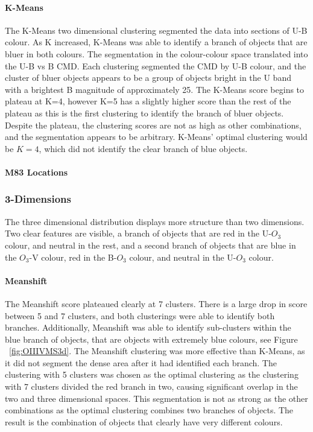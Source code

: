 \paragraph{K-Means}
The K-Means two dimensional clustering segmented the data into sections of U-B colour.
As K increased, K-Means was able to identify a branch of objects that are bluer in both colours.
The segmentation in the colour-colour space translated into the U-B vs B CMD. 
Each clustering segmented the CMD by U-B colour, and the cluster of bluer objects appears to be a group of objects bright in the U band with a brightest B magnitude of approximately 25.
The K-Means score begins to plateau at K=4, however K=5 has a slightly higher score than the rest of the plateau as this is the first clustering to identify the branch of bluer objects.
Despite the plateau, the clustering scores are not as high as other combinations, and the segmentation appears to be arbitrary.
K-Means' optimal clustering would be $K=4$, which did not identify the clear branch of blue objects.

\paragraph{M83 Locations}

\subsubsection{3-Dimensions}
The three dimensional distribution displays more structure than two dimensions.
Two clear features are visible, a branch of objects that are red in the U-$O_{3}$ colour, and neutral in the rest, and a second branch of objects that are blue in the $O_{3}$-V colour, red in the B-$O_{3}$ colour, and neutral in the U-$O_{3}$ colour.

\paragraph{Meanshift}
The Meanshift score plateaued clearly at 7 clusters. There is a large drop in score between 5 and 7 clusters, and both clusterings were able to identify both branches.
Additionally, Meanshift was able to identify sub-clusters within the blue branch of objects, that are objects with extremely blue colours, see Figure ~\ref{fig:OIIIVMS3d}.
The Meanshift clustering was more effective than K-Means, as it did not segment the dense area after it had identified each branch.
The clustering with 5 clusters was chosen as the optimal clustering as the clustering with 7 clusters divided the red branch in two, causing significant overlap in the two and three dimensional spaces.
This segmentation is not as strong as the other combinations as the optimal clustering combines two branches of objects.
The result is the combination of objects that clearly have very different colours.

